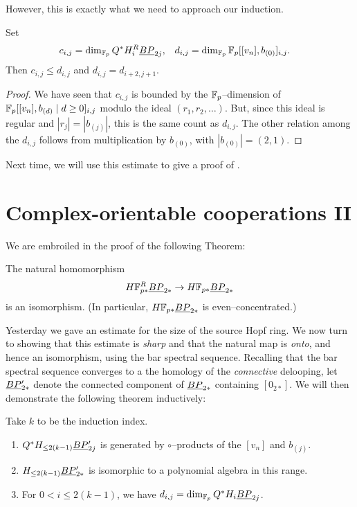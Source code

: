 \noindent However, this is exactly what we need to approach our induction.

\begin{lemma}
Set
\begin{align*}
c_{i,j} & = \dim_{\mathbb F_p} Q^* H_i^R \underline{\smash{BP}}_{2j}, &
d_{i,j} & = \dim_{\mathbb F_p} \mathbb F_p[[v_n], b_{(0)}]_{i,j}.
\end{align*}
Then $c_{i,j} \le d_{i,j}$ and $d_{i,j} = d_{i+2,j+1}$.
\end{lemma}
\begin{proof}
We have seen that $c_{i,j}$ is bounded by the $\mathbb F_p$--dimension of $\mathbb F_p[[v_n], b_{(d)} \mid d \ge 0]_{i,j}$ modulo the ideal $(r_1, r_2, \ldots)$.  But, since this ideal is regular and $|r_j| = |b_{(j)}|$, this is the same count as $d_{i,j}$.  The other relation among the $d_{i,j}$ follows from multiplication by $b_{(0)}$, with $|b_{(0)}| = (2, 1)$.
\end{proof}

Next time, we will use this estimate to give a proof of .



\section{Complex-orientable cooperations II}\label{COableCoopnsII}

We are embroiled in the proof of the following Theorem:

\begin{theorem}
The natural homomorphism \[H\mathbb F_{p*}^R \underline{\smash{BP}}_{2*} \to H\mathbb F_{p*} \underline{\smash{BP}}_{2*}\] is an isomorphism.  (In particular, $H\mathbb F_{p*} \underline{\smash{BP}}_{2*}$ is even--concentrated.)
\end{theorem}

Yesterday we gave an estimate for the size of the source Hopf ring.  We now turn to showing that this estimate is \emph{sharp} and that the natural map is \emph{onto}, and hence an isomorphism, using the bar spectral sequence.  Recalling that the bar spectral sequence converges to a the homology of the \emph{connective} delooping, let $\underline{\smash{BP}}_{2*}'$ denote the connected component of $\underline{\smash{BP}}_{2*}$ containing $[0_{2*}]$.  We will then demonstrate the following theorem inductively:
\begin{theorem}\label{HFpBPCooperationsInduction}
Take $k$ to be the induction index.
\begin{enumerate}
\item $Q^* H_{\le 2(k-1)} \underline{\smash{BP}}_{2j}'$ is generated by $\circ$--products of the $[v_n]$ and $b_{(j)}$.
\item $H_{\le 2(k-1)} \underline{\smash{BP}}_{2*}'$ is isomorphic to a polynomial algebra in this range.
\item For $0 < i \le 2(k-1)$, we have $d_{i,j} = \dim_{\mathbb F_p} Q^* H_i \underline{\smash{BP}}_{2j}$.
\end{enumerate}
\end{theorem}

